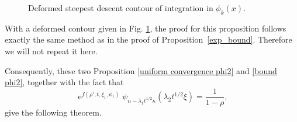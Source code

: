 \documentclass[cmp]{svjour}
\numberwithin{theorem}{section}
\numberwithin{equation}{section}
\DeclareMathOperator{\e}{e}
\begin{document}
\begin{figure}[h]
\begin{center}
\end{center}
\caption{Deformed steepest descent contour of integration in $\phi_k(x)$.}
\label{fig:contour gaussian 1 deform}
\end{figure}

With a deformed contour given in Fig. \ref{fig:contour gaussian 1 deform}, the proof for this proposition follows exactly the same method as in the proof of Proposition~\ref{exp_bound}. Therefore we will not repeat it here.


Consequently, these two Proposition \ref{uniform convergence phi2} and \ref{bound phi2}, together with the fact that
\begin{equation}
\label{uniform convergence psi2}
  \e^{f(\rho',t,\xi_1, \kappa_1)}\psi_{n-\lambda_1 t^{1/2}\kappa}(\lambda_2 t^{1/2}\xi)=\frac{1}{1-\rho},
\end{equation}
give the following theorem.
\end{document}
